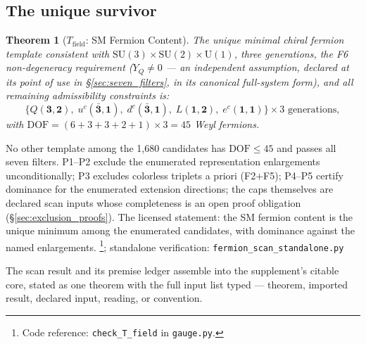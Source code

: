 \documentclass[11pt]{article}
\newtheorem{theorem}{Theorem}[section]
\theoremstyle{definition}
\newcommand{\SU}{\mathrm{SU}}
\newcommand{\U}{\mathrm{U}}
\newcommand{\coderef}[2]{\footnote{Code reference: \texttt{#1} in \texttt{#2}.}}
\begin{document}
\subsection{The unique survivor}
\label{sec:unique_survivor}

\begin{theorem}[$T_{\mathrm{field}}$: SM Fermion Content]\label{thm:Tfield}
The unique minimal chiral fermion template consistent with
$\SU(3) \times \SU(2) \times \U(1)$, three generations,
the F6 non-degeneracy requirement ($Y_Q \neq 0$ --- an independent
assumption, declared at its point of use in
\S\ref{sec:seven_filters}, in its canonical full-system form), and all
remaining admissibility constraints is:
\[
  \{Q(\mathbf{3},\mathbf{2}),\;
    u^c(\bar{\mathbf{3}},\mathbf{1}),\;
    d^c(\bar{\mathbf{3}},\mathbf{1}),\;
    L(\mathbf{1},\mathbf{2}),\;
    e^c(\mathbf{1},\mathbf{1})\}
  \times 3 \text{ generations},
\]
with $\mathrm{DOF} = (6+3+3+2+1) \times 3 = 45$ Weyl fermions.
\end{theorem}

\noindent No other template among the 1{,}680 candidates has
$\mathrm{DOF} \le 45$ and passes all seven filters.  P1--P2 exclude
the enumerated representation enlargements unconditionally; P3
excludes colorless triplets a priori (F2$+$F5); P4--P5 certify
dominance for the enumerated extension directions; the caps
themselves are declared scan inputs whose completeness is an open
proof obligation (\S\ref{sec:exclusion_proofs}).  The licensed
statement: the SM fermion content is the unique minimum among the
enumerated candidates, with dominance against the named enlargements.
\coderef{check\_T\_field}{gauge.py}; standalone verification: \texttt{fermion\_scan\_standalone.py}~\cite{BrookeFermionScan}

The scan result and its premise ledger assemble into the
supplement's citable core, stated as one theorem with the full input
list typed --- theorem, imported result, declared input, reading, or
convention.
\end{document}
